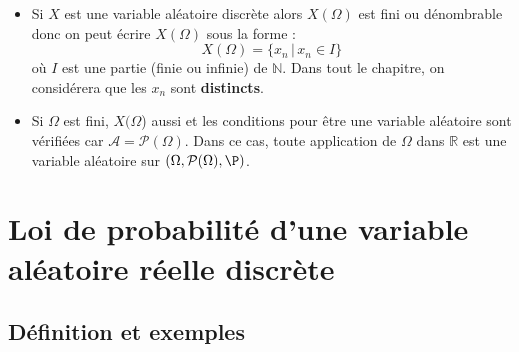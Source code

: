 \documentclass[french,11pt,twoside]{VcCours}
\begin{document}
\begin{Remarques}{}
\begin{itemize}
\item Si $X$ est une variable aléatoire discrète alors $X(\Omega)$ est fini ou dénombrable donc on peut écrire $X(\Omega)$ sous la forme :
$$ X(\Omega) = \lbrace x_n \, \vert \, x_n \in I \rbrace$$
où $I$ est une partie (finie ou infinie) de $\mathbb{N}$. Dans tout le chapitre, on considérera que les $x_n$ sont \textbf{distincts}.
\item Si $\Omega$ est fini, $X(\Omega$) aussi et les conditions pour être une variable aléatoire sont vérifiées car $\mathcal{A}= \mathcal{P}(\Omega)$. Dans ce cas, toute application de $\Omega$ dans $\mathbb{R}$  est une variable aléatoire sur $(\Omega, \mathcal{P}(\Omega), \P)$.
\end{itemize}
\end{Remarques}


%
%

\section{Loi de probabilité d'une variable aléatoire réelle discrète}
\subsection{Définition et exemples}
\end{document}
